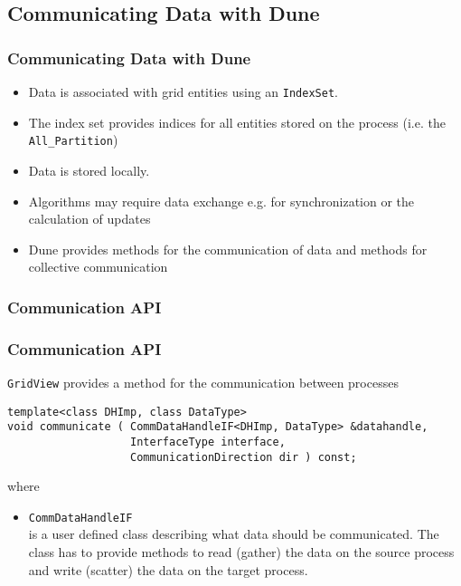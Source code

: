 \subsection{Communicating Data with Dune}
\begin{frame}[fragile]
  \frametitle<presentation>{Communicating Data with Dune}


  \begin{itemize}
  \item Data is associated with grid entities using an \texttt{IndexSet}.
  \item The index set provides indices for all entities stored on the process (i.e. the \texttt{All\_Partition})
  \item Data is stored locally.
  \item Algorithms may require data exchange e.g. for synchronization or the calculation of updates
  \item Dune provides methods for the communication of data and methods for collective communication
  \end{itemize}

\end{frame}

\subsubsection{Communication API}
\begin{frame}[fragile]
  \frametitle<presentation>{Communication API}

  \texttt{GridView} provides a method for the communication between processes
    \begin{lstlisting}
template<class DHImp, class DataType>
void communicate ( CommDataHandleIF<DHImp, DataType> &datahandle,
                   InterfaceType interface,
                   CommunicationDirection dir ) const;
    \end{lstlisting}
where
    \begin{itemize}
    \item \lstinline!CommDataHandleIF!\\
      is a user defined class describing what data should be communicated. The class has to provide methods to read (gather) the data on the
      source process and write (scatter) the data on the target process.
    \end{itemize}
\end{frame}


